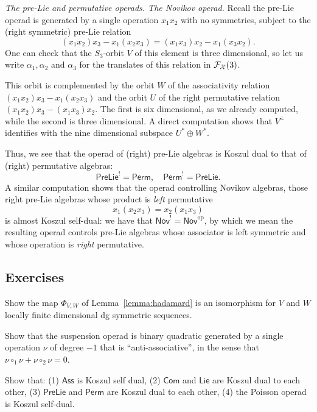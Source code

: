 \bigskip

\emph{The pre-Lie and permutative operads. 
The Novikov operad.}
Recall the pre-Lie operad is generated by a single 
operation $x_1x_2$ with no symmetries, subject to 
the (right symmetric) pre-Lie relation
\[(x_1x_2)x_3 - x_1(x_2x_3) = (x_1x_3)x_2 - x_1(x_3x_2). \]
One can check that the $S_3$-orbit $V$ of 
this element is three dimensional,
so let us write $\alpha_1,\alpha_2$ and 
$\alpha_3$ for the translates of
this relation in $\mathcal{F}_{\mathcal{X}}(3)$. 

This orbit is complemented by the orbit $W$ of the 
associativity relation $(x_1x_2)x_3 - x_1(x_2x_3)$
 and the orbit $U$ of the right permutative relation
$(x_1x_2)x_3 - (x_1x_3)x_2$. 
The first is six dimensional, as we already
computed, while the second is three dimensional. 
A direct computation shows 
that $V^\perp$ identifies 
with the nine dimensional subspace 
$U^*\oplus W^*$. 

Thus, we see that the operad of (right)
pre-Lie algebras is Koszul dual to that
of (right) permutative algebras:
\[ \mathsf{PreLie}^! = \mathsf{Perm},\quad
 	\mathsf{Perm}^! = \mathsf{PreLie}.\]
A similar computation shows that the operad 
controlling Novikov algebras,
those right pre-Lie algebras whose product 
is \emph{left} permutative
\[ x_1(x_2x_3) = x_2(x_1x_3) \]
is almost Koszul self-dual: we have that $\mathsf{Nov}^! = 
\mathsf{Nov}^{\mathrm{op}}$, by which we mean the resulting
operad controls pre-Lie algebras whose associator is
left symmetric and whose operation is \emph{right} 
permutative.
\subsection{Exercises}

\begin{question}\label{ex:suspensions}
Show the map $\Phi_{V,W}$ of Lemma~\ref{lemma:hadamard}
is an isomorphism for $V$ and $W$ locally finite dimensional
dg symmetric sequences.
\end{question}

\begin{question}\label{ex:suspensionoperad}
Show that the suspension operad is binary quadratic
generated by a single operation $\nu$ of degree $-1$
that is ``anti-associative'', in the sense that
$\nu\circ_1\nu + \nu\circ_2\nu=0$. 
\end{question}
\begin{question}\label{ex:duals} Show that:
(1) $\mathsf{Ass}$ is Koszul
self dual, (2) $\mathsf{Com}$ and $\mathsf{Lie}$
are Koszul dual to each other, (3) $\mathsf{PreLie}$
and $\mathsf{Perm}$ are Koszul dual to each
other, (4) the Poisson operad is Koszul self-dual.
\end{question}

